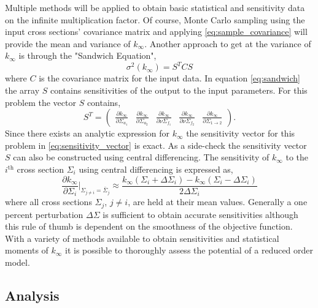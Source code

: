 Multiple methods will be applied to obtain basic statistical and sensitivity data on the infinite multiplication factor. Of course, Monte Carlo sampling using the input cross sections' covariance matrix and applying \ref{eq:sample_covariance} will provide the mean and variance of $k_{\infty}$. Another approach to get at the variance of $k_{\infty}$ is through the "Sandwich Equation"\cite{Jessee_Turinsky},
\begin{equation}
\label{eq:sandwich}
   \sigma^2(k_{\infty}) = S^TCS
\end{equation}      
where $C$ is the covariance matrix for the input data. In equation \ref{eq:sandwich} the array $S$ contains sensitivities of the output to the input parameters. For this problem the vector $S$ contains,
\begin{equation}
\label{eq:sensitivity_vector}
   S^T = \left(
    \begin{array}{ccccc}
     \frac{\partial k_{\infty}}{\partial\Sigma_{a_1}} &
     \frac{\partial k_{\infty}}{\partial\Sigma_{a_2}} &
     \frac{\partial k_{\infty}}{\partial\nu\Sigma_{f_1}} &
     \frac{\partial k_{\infty}}{\partial\nu\Sigma_{f_2}} &
     \frac{\partial k_{\infty}}{\partial\Sigma_{1\rightarrow 2}}
    \end{array}
         \right).
\end{equation} 
Since there exists an analytic expression for $k_{\infty}$ the sensitivity vector for this problem in \ref{eq:sensitivity_vector} is exact. As a side-check the sensitivity vector $S$ can also be constructed using central differencing. The sensitivity of $k_{\infty}$ to the $i^{\text{th}}$ cross section $\Sigma_i$ using central differencing is expressed as, 
\begin{equation}
\label{eq:central_diff_kinf}
   \frac{\partial k_{\infty}}{\partial \Sigma_i}\biggr\rvert_
   {\Sigma_{j\neq i} = \bar{\Sigma}_j}
    \approx \frac{k_{\infty}(\Sigma_i + \Delta\Sigma_i) - 
    k_{\infty}(\Sigma_i - \Delta\Sigma_i)}
    {2\Delta\Sigma_i}
\end{equation} 
where all cross sections $\Sigma_j$, $j\neq i$, are held at their mean values. Generally a one percent perturbation $\Delta\Sigma$ is sufficient to obtain accurate sensitivities although this rule of thumb is dependent on the smoothness of the objective function. With a variety of methods available to obtain sensitivities and statistical moments of $k_{\infty}$ it is possible to thoroughly assess the potential of a reduced order model.       
     
\subsection{Analysis}
\label{subsec:kinf_analysis}


